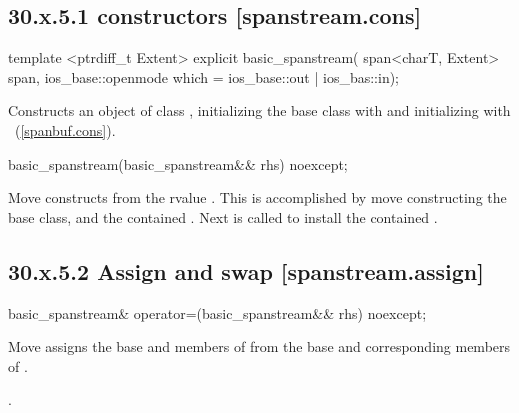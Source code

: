 \documentclass[ebook,11pt,article]{memoir}
\begin{document}
\subsection{30.x.5.1  constructors [spanstream.cons]}
\label{spanstream.cons}

\begin{itemdecl}
template <ptrdiff_t Extent>
explicit basic_spanstream(
  span<charT, Extent> span,
  ios_base::openmode which = ios_base::out | ios_bas::in);
\end{itemdecl}

\begin{itemdescr}
\pnum
\effects
Constructs an object of class
,
initializing the base class with
and initializing  with
~(\ref{spanbuf.cons}).
\end{itemdescr}

\begin{itemdecl}
basic_spanstream(basic_spanstream&& rhs) noexcept;
\end{itemdecl}

\begin{itemdescr}
\pnum
\effects Move constructs from the rvalue . This
is accomplished by move constructing the base class, and the contained
.
Next  is called to
install the contained .
\end{itemdescr}

\subsection{30.x.5.2 Assign and swap [spanstream.assign]}
\label{spanstream.assign}

\begin{itemdecl}
basic_spanstream& operator=(basic_spanstream&& rhs) noexcept;
\end{itemdecl}

\begin{itemdescr}
\pnum
\effects Move assigns the base and members of  from the base and corresponding
members of .

\pnum
\returns {}.
\end{itemdescr}
\end{document}
